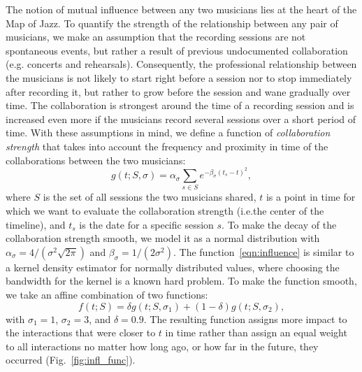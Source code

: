 \documentclass[12pt]{cmuthesis}
\begin{document}
  The notion of mutual influence between any two musicians lies at the heart of
  the Map of Jazz.
  To quantify the strength of the relationship between any pair of musicians, we
  make an assumption that the recording sessions are not spontaneous events,
  but rather a result of previous undocumented collaboration (e.g. concerts and
  rehearsals). Consequently, the professional relationship between the musicians
  is not likely to start right before a session nor to stop immediately after
  recording it, but rather to grow before the session and wane gradually over
  time. The collaboration is strongest around the
  time of a recording session and is increased even more if the musicians record
  several sessions over a short period of time.
  With these assumptions in mind, we define a function of
  \emph{collaboration strength} that takes into account the frequency and
  proximity in time of the collaborations between the two musicians:
  \begin{equation}\label{eqn:influence}
  g(t; S, \sigma) = \alpha_\sigma \sum_{s \in S} e^{-\beta_\sigma(t_s-t)^2 },
  \end{equation}
  where $S$ is the set of all sessions the two musicians shared, $t$ is a point in
  time for which we want to evaluate the collaboration strength (i.e.\@ the center
  of the timeline), and $t_s$ is the date for a specific session $s$. To make the
  decay of the collaboration strength smooth, we model it as a normal distribution
  with $\alpha_\sigma = 4/(\sigma^2\sqrt{2\pi})$ and $\beta_\sigma = 1/(2\sigma^2)$.
  The function~\eqref{eqn:influence} is similar to a kernel density estimator for
  normally distributed values, where choosing the bandwidth for the kernel is a
  known hard problem. To make the function smooth, we take an affine combination
  of two functions:
  \begin{equation}\label{eqn:influence2}
  f(t; S) = \delta g(t; S, \sigma_1) + (1-\delta)g(t; S, \sigma_2),
  \end{equation}
  with $\sigma_1 = 1$, $\sigma_2 = 3$, and $\delta=0.9$. The resulting function
  assigns more impact to the interactions that were closer to $t$ in time rather
  than assign an equal weight to all interactions no matter how long ago, or how
  far in the future, they occurred (Fig.~\ref{fig:infl_func}).

\end{document}
